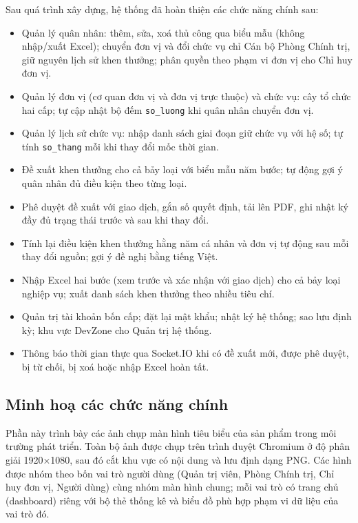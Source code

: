 \documentclass[../DoAn.tex]{subfiles}
\begin{document}
Sau quá trình xây dựng, hệ thống đã hoàn thiện các chức năng chính sau:

\begin{itemize}
    \item Quản lý quân nhân: thêm, sửa, xoá thủ công qua biểu mẫu (không nhập/xuất Excel); chuyển đơn vị và đổi chức vụ chỉ Cán bộ Phòng Chính trị, giữ nguyên lịch sử khen thưởng; phân quyền theo phạm vi đơn vị cho Chỉ huy đơn vị.
    \item Quản lý đơn vị (cơ quan đơn vị và đơn vị trực thuộc) và chức vụ: cây tổ chức hai cấp; tự cập nhật bộ đếm \texttt{so\_luong} khi quân nhân chuyển đơn vị.
    \item Quản lý lịch sử chức vụ: nhập danh sách giai đoạn giữ chức vụ với hệ số; tự tính \texttt{so\_thang} mỗi khi thay đổi mốc thời gian.
    \item Đề xuất khen thưởng cho cả bảy loại với biểu mẫu năm bước; tự động gợi ý quân nhân đủ điều kiện theo từng loại.
    \item Phê duyệt đề xuất với giao dịch, gắn số quyết định, tải lên PDF, ghi nhật ký đầy đủ trạng thái trước và sau khi thay đổi.
    \item Tính lại điều kiện khen thưởng hằng năm cá nhân và đơn vị tự động sau mỗi thay đổi nguồn; gợi ý đề nghị bằng tiếng Việt.
    \item Nhập Excel hai bước (xem trước và xác nhận với giao dịch) cho cả bảy loại nghiệp vụ; xuất danh sách khen thưởng theo nhiều tiêu chí.
    \item Quản trị tài khoản bốn cấp; đặt lại mật khẩu; nhật ký hệ thống; sao lưu định kỳ; khu vực DevZone cho Quản trị hệ thống.
    \item Thông báo thời gian thực qua Socket.IO khi có đề xuất mới, được phê duyệt, bị từ chối, bị xoá hoặc nhập Excel hoàn tất.
\end{itemize}

\subsection{Minh hoạ các chức năng chính}
\label{subsection:4.3.3}

Phần này trình bày các ảnh chụp màn hình tiêu biểu của sản phẩm trong môi trường phát triển. Toàn bộ ảnh được chụp trên trình duyệt Chromium ở độ phân giải 1920×1080, sau đó cắt khu vực có nội dung và lưu định dạng PNG. Các hình được nhóm theo bốn vai trò người dùng (Quản trị viên, Phòng Chính trị, Chỉ huy đơn vị, Người dùng) cùng nhóm màn hình chung; mỗi vai trò có trang chủ (dashboard) riêng với bộ thẻ thống kê và biểu đồ phù hợp phạm vi dữ liệu của vai trò đó.
\end{document}
